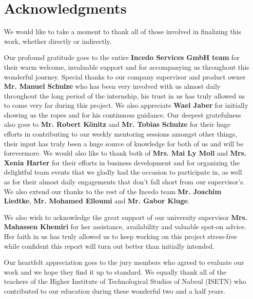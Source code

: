 \section*{Acknowledgments}
We would like to take a moment to thank all of those involved in finalizing this work, whether directly or indirectly.

\medskip
\noindent Our profound gratitude goes to the entire \textbf{Incedo Services GmbH team} for their warm welcome, invaluable support and for accompanying us throughout this wonderful journey.
Special thanks to our company supervisor and product owner \textbf{Mr. Manuel Schulze} who has been very involved with us almost daily throughout the long period of the internship, his trust in us has truly allowed us to come very far during this project.
We also appreciate \textbf{Wael Jaber} for initially showing us the ropes and for his continuous guidance.
Our deepest gratefulness also goes to \textbf{Mr. Robert Könitz} and \textbf{Mr. Tobias Schulze} for their huge efforts in contributing to our weekly mentoring sessions amongst other things, their input has truly been a huge source of knowledge for both of us and will be forevermore.
We would also like to thank both of \textbf{Mrs. Mai Ly Moll} and \textbf{Mrs. Xenia Harter} for their efforts in business development and for organizing the delightful team events that we gladly had the occasion to participate in, as well as for their almost daily engagements that don't fall short from our supervisor's. We also extend our thanks to the rest of the Incedo team \textbf{Mr. Joachim Liedtke}, \textbf{Mr. Mohamed Elloumi} and \textbf{Mr. Gabor Kluge}.

\medskip
\noindent We also wish to acknowledge the great support of our university supervisor \textbf{Mrs. Mahassen Khemiri} for her assistance, availability and valuable spot-on advice.
Her faith in us has truly allowed us to keep working on this project stress-free while confident this report will turn out better than initially intended.

\medskip
\noindent Our heartfelt appreciation goes to the jury members who agreed to evaluate our work and we hope they find it up to standard.
We equally thank all of the teachers of the Higher Institute of Technological Studies of Nabeul (ISETN) who contributed to our education during these wonderful two and a half years.


\newpage
